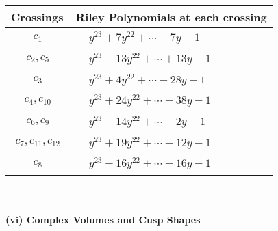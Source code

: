 \documentclass[1p]{elsarticle_modified}
\theoremstyle{definition}
\begin{document}
\begin{tabular}{m{50pt}|m{274pt}}
Crossings & \hspace{64pt}Riley Polynomials at each crossing \\
\hline $$\begin{aligned}c_{1}\end{aligned}$$&$\begin{aligned}
&y^{23}+7 y^{22}+\cdots-7 y-1
\end{aligned}$\\
\hline $$\begin{aligned}c_{2},c_{5}\end{aligned}$$&$\begin{aligned}
&y^{23}-13 y^{22}+\cdots+13 y-1
\end{aligned}$\\
\hline $$\begin{aligned}c_{3}\end{aligned}$$&$\begin{aligned}
&y^{23}+4 y^{22}+\cdots-28 y-1
\end{aligned}$\\
\hline $$\begin{aligned}c_{4},c_{10}\end{aligned}$$&$\begin{aligned}
&y^{23}+24 y^{22}+\cdots-38 y-1
\end{aligned}$\\
\hline $$\begin{aligned}c_{6},c_{9}\end{aligned}$$&$\begin{aligned}
&y^{23}-14 y^{22}+\cdots-2 y-1
\end{aligned}$\\
\hline $$\begin{aligned}c_{7},c_{11},c_{12}\end{aligned}$$&$\begin{aligned}
&y^{23}+19 y^{22}+\cdots-12 y-1
\end{aligned}$\\
\hline $$\begin{aligned}c_{8}\end{aligned}$$&$\begin{aligned}
&y^{23}-16 y^{22}+\cdots-16 y-1
\end{aligned}$\\
\hline
\end{tabular}\\~\\
\newpage\flushleft \textbf{(vi) Complex Volumes and Cusp Shapes}
\end{document}
